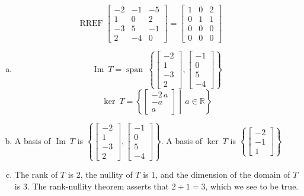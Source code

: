 \begin{exerciseAnswer} 


\[\operatorname{RREF} \left[\begin{array}{ccc}
-2 & -1 & -5 \\
1 & 0 & 2 \\
-3 & 5 & -1 \\
2 & -4 & 0
\end{array}\right] = \left[\begin{array}{ccc}
1 & 0 & 2 \\
0 & 1 & 1 \\
0 & 0 & 0 \\
0 & 0 & 0
\end{array}\right] \]


\begin{enumerate}[(a)]
\item \[\operatorname{Im}\ T = \operatorname{span}\  \left\{ \left[\begin{array}{c}
-2 \\
1 \\
-3 \\
2
\end{array}\right] , \left[\begin{array}{c}
-1 \\
0 \\
5 \\
-4
\end{array}\right] \right\} \]\[\operatorname{ker}\ T =  \left\{ \left[\begin{array}{c}
-2 \, a \\
-a \\
a
\end{array}\right] \middle|\,a\in\mathbb{R}\right\} \]
\item  A basis of \(\operatorname{Im}\ T\) is \( \left\{ \left[\begin{array}{c}
-2 \\
1 \\
-3 \\
2
\end{array}\right] , \left[\begin{array}{c}
-1 \\
0 \\
5 \\
-4
\end{array}\right] \right\} \). A basis of \(\operatorname{ker}\ T\) is \( \left\{ \left[\begin{array}{c}
-2 \\
-1 \\
1
\end{array}\right] \right\} \)
\item  The rank of \(T\) is \( 2 \), the nullity of \(T\) is \( 1 \), and the dimension of the domain of \(T\) is \( 3 \). The rank-nullity theorem asserts that \( 2 + 1 = 3 \), which we see to be true. 
\end{enumerate}
    
\end{exerciseAnswer}
    
